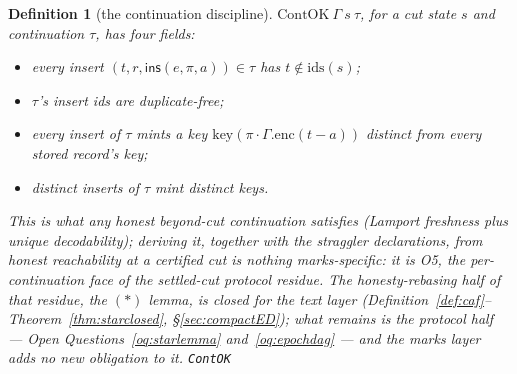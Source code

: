 \documentclass[11pt]{article}
\newtheorem{definition}[theorem]{Definition}
\newcommand{\lean}[1]{\texttt{#1}}
\newcommand{\ins}{\mathsf{ins}}
\begin{document}
\begin{definition}[the continuation discipline]
\label{def:contok}
$\mathrm{ContOK}\ \Gamma\ s\ \tau$, for a cut state $s$ and
continuation $\tau$, has four fields:
\begin{itemize}[leftmargin=2em]
\item[(\emph{freshId})] every insert $(t, r, \ins(e, \pi, a)) \in
  \tau$ has $t \notin \mathrm{ids}(s)$;
\item[(\emph{nodupIns})] $\tau$'s insert ids are duplicate-free;
\item[(\emph{freshKeySt})] every insert of $\tau$ mints a key
  $\mathrm{key}(\pi \cdot \Gamma.\mathrm{enc}(t - a))$ distinct from
  every stored record's key;
\item[(\emph{freshKeyPair})] distinct inserts of $\tau$ mint
  distinct keys.
\end{itemize}
This is what any honest beyond-cut continuation satisfies (Lamport
freshness plus unique decodability); \emph{deriving} it, together
with the straggler declarations, from honest reachability at a
certified cut is nothing marks-specific: it is O5, the
per-continuation face of the settled-cut protocol residue. The
honesty-rebasing half of that residue, the $(\ast)$ lemma, is
\emph{closed} for the text layer
(Definition~\ref{def:caf}--Theorem~\ref{thm:starclosed},
\S\ref{sec:compactED}); what remains is the protocol half --- Open
Questions~\ref{oq:starlemma} and~\ref{oq:epochdag} --- and the marks
layer adds no new obligation to it.
\hfill\lean{ContOK}
\end{definition}
\end{document}
